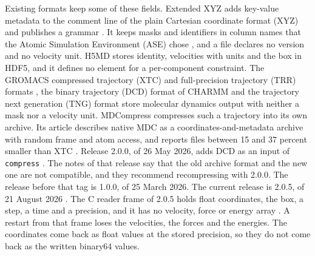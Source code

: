 \documentclass[preprint,12pt]{elsarticle}
\begin{document}
Existing formats keep some of these fields.
Extended XYZ adds key-value metadata to the comment line of the plain
Cartesian coordinate format (XYZ) and publishes a grammar
\cite{kermodeLibatomsExtxyzV0462026}.
It keeps masks and identifiers in column names that the Atomic
Simulation Environment (ASE) chose
\cite{larsenAtomicSimulationEnvironmenta2017}, and a file declares no
version and no velocity unit.
H5MD
\cite{buylH5mdStructuredEfficient2014,folkOverviewHdf5Technology2011}
stores identity, velocities with units and the box in HDF5, and it
defines no element for a per-component constraint.
The GROMACS compressed trajectory (XTC) and full-precision trajectory
(TRR) formats \cite{abrahamGromacsHighPerformance2015}, the binary
trajectory (DCD) format of CHARMM
\cite{brooksCharmmBiomolecularSimulation2009} and the trajectory next
generation (TNG) format
\cite{spangbergTrajectoryNgPortable2011,lundborgEfficientExtensibleFormat2014}
store molecular dynamics output with neither a mask nor a velocity unit.
MDCompress compresses such a trajectory into its own archive.
Its article describes native MDC as a coordinates-and-metadata archive
with random frame and atom access, and reports files between 15 and 37
percent smaller than XTC \cite{kokotMdcompressBetterFaster2026}.
Release 2.0.0, of 26 May 2026, adds DCD as an input of
\texttt{compress} \cite{kokotMdcompress2002026}.
The notes of that release say that the old archive format and the new
one are not compatible, and they recommend recompressing with 2.0.0.
The release before that tag is 1.0.0, of 25 March 2026.
The current release is 2.0.5, of 21 August 2026
\cite{kokotMdcompress2052026}.
The C reader frame of 2.0.5 holds float coordinates, the box, a step, a
time and a precision, and it has no velocity, force or energy array
\cite{kokotMdcompressFrame2052026}.
A restart from that frame loses the velocities, the forces and the
energies.
The coordinates come back as float values at the stored precision, so
they do not come back as the written binary64 values.
\end{document}
